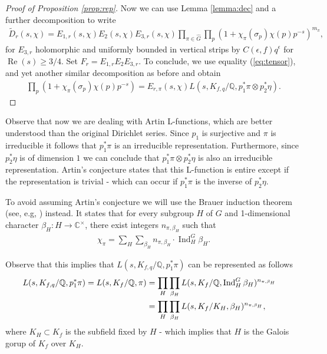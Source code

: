 \documentclass[12pt]{amsart}
\def\C{{\mathbb C}}
\def\Q{{\mathbb Q}}
\def\\{\cr}
\def\ge{\geqslant}
\begin{document}
\begin{proof}[Proof of Proposition \ref{prop:rep}]
Now we can use Lemma \ref{lemma:dec} and a further decomposition to write
\begin{align*}
\tilde{D}_r(s,\chi) = E_{1,r}(s,\chi)E_{2}(s,\chi)E_{3,r}(s,\chi) \prod_{\pi \in \hat{G}} \prod_{p} (1+\chi_{\pi}(\sigma_p) \chi(p)p^{-s})^{m_\pi},
\end{align*}
for $E_{3,r}$ holomorphic and uniformly bounded in vertical strips by \newline $C(\epsilon, f)q^\epsilon$ for $\operatorname{Re}(s) \ge 3/4$.  Set $F_r = E_{1,r}E_{2}E_{3,r}$. To conclude, we use equality (\ref{eq:tensor}), and yet another similar decomposition as before and obtain 
\begin{align*}
\prod_p ( 1+ \chi_\pi(\sigma_p)\chi(p)p^{-s}) = E_{r,\pi}(s,\chi) L(s, K_{f,q}/\Q, p_1^\ast \pi \otimes p_2^\ast\eta).
\end{align*}
\end{proof}

Observe that now we are dealing with Artin L-functions, which are better understood than the original Dirichlet series. Since $p_1$ is surjective and $\pi$ is irreducible it follows that $p_1^\ast \pi $ is an irreducible representation. Furthermore,  since $p_2^\ast \eta$ is of dimension $1$ we can conclude that $p_1^\ast \pi \otimes p_2^\ast \eta$ is also an irreducible representation. Artin's conjecture states that this L-function is entire except if the representation is trivial - which can occur if $p_1^\ast \pi$ is the inverse of $p_2^\ast\eta$.

To avoid assuming Artin's conjecture we will use the Brauer induction theorem (see, e.g, \cite[Theorem 19]{Serre}) instead.  It states that for every subgroup $H$ of $G$ and 1-dimensional character $\beta_H:H \rightarrow \C^\times$,  there exist integers $n_{\pi,  \beta_H}$ such that
\begin{align*}
\chi_\pi = \sum_{H}\sum_{\beta_H} n_{\pi, \beta_H} \cdot {\operatorname{Ind}_H^G} \beta_H.
\end{align*} 

 Observe that this implies that $L(s, K_{f,q}/\Q, p_1^\ast \pi)$ can be represented as follows
 \begin{align*}
 L(s, K_{f,q}/\Q, p_1^\ast \pi) = L(s, K_f/\Q, \pi) & = \prod_{H}\prod_{\beta_H} L(s, K_f/\Q, \operatorname{Ind}_H^G \beta_H)^{n_{\pi, \beta_H}}\\
 & =  \prod_{H}\prod_{\beta_H}L(s, K_f/K_H, \beta_H)^{n_{\pi, \beta_H}},
 \end{align*}
where $K_H \subset K_f$ is the subfield fixed by $H$ - which implies that $H$ is the Galois gorup of $K_f$ over $K_H$.
\end{document}
